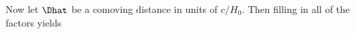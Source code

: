 Now let $\Dhat$ be a comoving distance in units of $c/H_0$.  Then filling in all of the factors yields